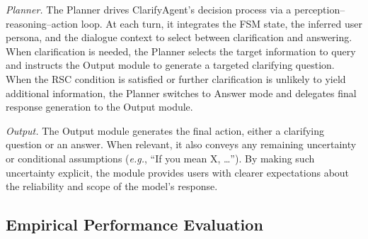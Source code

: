 \documentclass[sigconf]{acmart}
\newcommand{\model}{ClarifyAgent\xspace}
\begin{document}
\textit{Planner.}
The Planner drives \model{}’s decision process via a perception–reasoning–action loop. At each turn, it integrates the FSM state, the inferred user persona, and the dialogue context to select between clarification and answering. When clarification is needed, the Planner selects the target information to query and instructs the Output module to generate a targeted clarifying question. When the RSC condition is satisfied or further clarification is unlikely to yield additional information, the Planner switches to {Answer} mode and delegates final response generation to the Output module.




\textit{Output.}
The Output module generates the final action, either a clarifying question or an answer.  
When relevant, it also conveys any remaining uncertainty or conditional assumptions (\textit{e.g.}, “If you mean X, …”).  
By making such uncertainty explicit, the module provides users with clearer expectations about the reliability and scope of the model’s response.



\subsection{Empirical Performance Evaluation}
\end{document}
